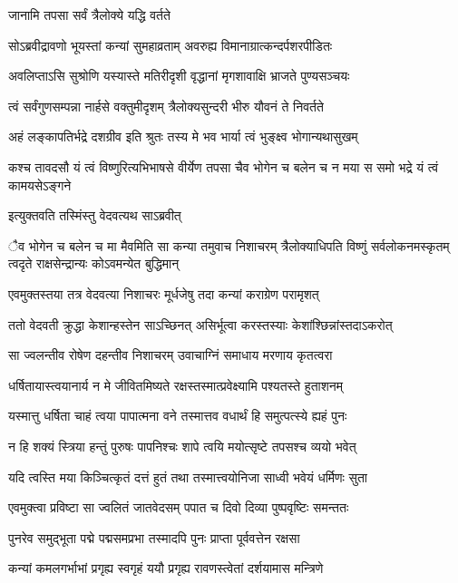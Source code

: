 \onelineshloka
{जानामि तपसा सर्वं त्रैलोक्ये यद्धि वर्तते} %

\twolineshloka
{सोऽब्रवीद्रावणो भूयस्तां कन्यां सुमहाव्रताम्}
{अवरुह्य विमानाग्रात्कन्दर्पशरपीडितः} %

\twolineshloka
{अवलिप्ताऽसि सुश्रोणि यस्यास्ते मतिरीदृशी}
{वृद्धानां मृगशावाक्षि भ्राजते पुण्यसञ्चयः} %

\twolineshloka
{त्वं सर्वंगुणसम्पन्ना नार्हसे वक्तुमीदृशम्}
{त्रैलोक्यसुन्दरी भीरु यौवनं ते निवर्तते} %

\twolineshloka
{अहं लङ्कापतिर्भद्रे दशग्रीव इति श्रुतः}
{तस्य मे भव भार्या त्वं भुङ्क्ष्व भोगान्यथासुखम्} %

\twolineshloka
{कश्च तावदसौ यं त्वं विष्णुरित्यभिभाषसे}
{वीर्येण तपसा चैव भोगेन च बलेन च न मया स समो भद्रे यं त्वं कामयसेऽङ्गने} %

\onelineshloka
{इत्युक्तवति तस्मिंस्तु वेदवत्यथ साऽब्रवीत्} %

\threelineshloka
{ैव भोगेन च बलेन च मा मैवमिति सा कन्या तमुवाच निशाचरम्}
{त्रैलोक्याधिपति विष्णुं सर्वलोकनमस्कृतम्}
{त्वदृते राक्षसेन्द्रान्यः कोऽवमन्येत बुद्धिमान्} %

\twolineshloka
{एवमुक्तस्तया तत्र वेदवत्या निशाचरः}
{मूर्धजेषु तदा कन्यां कराग्रेण परामृशत्} %

\twolineshloka
{ततो वेदवती क्रुद्धा केशान्हस्तेन साऽच्छिनत्}
{असिर्भूत्वा करस्तस्याः केशांश्छिन्नांस्तदाऽकरोत्} %

\twolineshloka
{सा ज्वलन्तीव रोषेण दहन्तीव निशाचरम्}
{उवाचाग्निं समाधाय मरणाय कृतत्वरा} %

\twolineshloka
{धर्षितायास्त्वयानार्य न मे जीवितमिष्यते}
{रक्षस्तस्मात्प्रवेक्ष्यामि पश्यतस्ते हुताशनम्} %

\twolineshloka
{यस्मात्तु धर्षिता चाहं त्वया पापात्मना वने}
{तस्मात्तव वधार्थं हि समुत्पत्स्ये ह्यहं पुनः} %

\twolineshloka
{न हि शक्यं स्त्रिया हन्तुं पुरुषः पापनिश्चः}
{शापे त्वयि मयोत्सृष्टे तपसश्च व्ययो भवेत्} %

\twolineshloka
{यदि त्वस्ति मया किञ्चित्कृतं दत्तं हुतं तथा}
{तस्मात्त्वयोनिजा साध्वी भवेयं धर्मिणः सुता} %

\twolineshloka
{एवमुक्त्वा प्रविष्टा सा ज्वलितं जातवेदसम्}
{पपात च दिवो दिव्या पुष्पवृष्टिः समन्ततः} %

\twolineshloka
{पुनरेव समुद्भूता पद्मे पद्मसमप्रभा}
{तस्मादपि पुनः प्राप्ता पूर्ववत्तेन रक्षसा} %

\twolineshloka
{कन्यां कमलगर्भाभां प्रगृह्य स्वगृहं ययौ}
{प्रगृह्य रावणस्त्वेतां दर्शयामास मन्त्रिणे} %

